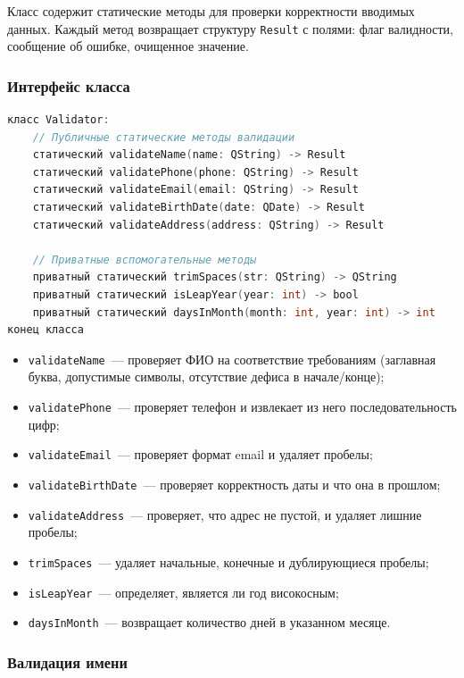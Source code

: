 Класс содержит статические методы для проверки корректности вводимых данных. Каждый метод возвращает структуру \texttt{Result} с полями: флаг валидности, сообщение об ошибке, очищенное значение.

\subsubsection*{Интерфейс класса}

\begin{lstlisting}[language=C, caption=Заголовочный файл validator.h]
класс Validator:
    // Публичные статические методы валидации
    статический validateName(name: QString) -> Result
    статический validatePhone(phone: QString) -> Result
    статический validateEmail(email: QString) -> Result
    статический validateBirthDate(date: QDate) -> Result
    статический validateAddress(address: QString) -> Result

    // Приватные вспомогательные методы
    приватный статический trimSpaces(str: QString) -> QString
    приватный статический isLeapYear(year: int) -> bool
    приватный статический daysInMonth(month: int, year: int) -> int
конец класса
\end{lstlisting}

\begin{itemize}
    \item \texttt{validateName}~--- проверяет ФИО на соответствие требованиям (заглавная буква, допустимые символы, отсутствие дефиса в начале/конце);
    \item \texttt{validatePhone}~--- проверяет телефон и извлекает из него последовательность цифр;
    \item \texttt{validateEmail}~--- проверяет формат email и удаляет пробелы;
    \item \texttt{validateBirthDate}~--- проверяет корректность даты и что она в прошлом;
    \item \texttt{validateAddress}~--- проверяет, что адрес не пустой, и удаляет лишние пробелы;
    \item \texttt{trimSpaces}~--- удаляет начальные, конечные и дублирующиеся пробелы;
    \item \texttt{isLeapYear}~--- определяет, является ли год високосным;
    \item \texttt{daysInMonth}~--- возвращает количество дней в указанном месяце.
\end{itemize}

\subsubsection*{Валидация имени}

